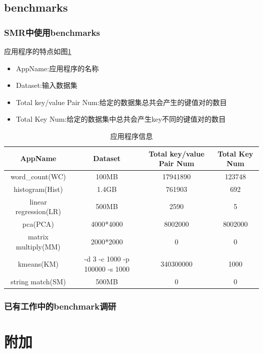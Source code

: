 \subsection{benchmarks}
\subsubsection{SMR中使用benchmarks}
应用程序的特点如图\ref{appArgs}
\begin{itemize}
\item{AppName:应用程序的名称}
\item{Dataset:输入数据集}
\item{Total key/value Pair Num:给定的数据集总共会产生的键值对的数目}
\item{Total Key Num:给定的数据集中总共会产生key不同的键值对的数目}
\end{itemize}
\begin{table}[!h]
\begin{footnotesize}
\caption{应用程序信息}
\begin{tabularx}{1.22\textwidth}{|c|c|c|c|}
\hline
\textbf{AppName} & \textbf{Dataset} &\textbf{Total key/value Pair Num} &\textbf{Total Key Num}\\
\hline
word\_count(WC) & 100MB & 17941890 & 123748\\  
\hline
histogram(Hist) & 1.4GB &  761903& 692\\ 
\hline
linear regression(LR) & 500MB & 2590& 5\\ 
\hline
pca(PCA) & 4000*4000 & 8002000& 8002000\\ 
\hline
matrix multiply(MM) & 2000*2000 & 0& 0\\ 
\hline
kmeans(KM) & -d 3 -c 1000 -p 100000 -s 1000& 340300000 & 1000\\ 
\hline
string match(SM) & 500MB & 0& 0\\ 
\hline
\end{tabularx}
\label{appArgs}
\end{footnotesize}
\end{table}

\subsubsection{已有工作中的benchmark调研}



\section{附加}


